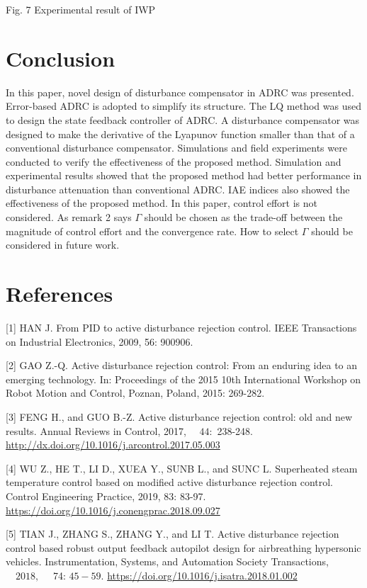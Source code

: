 \documentclass[10pt]{article}
\begin{document}
Fig. 7 Experimental result of IWP

\section{Conclusion}
In this paper, novel design of disturbance compensator in ADRC was presented. Error-based ADRC is adopted to simplify its structure. The LQ method was used to design the state feedback controller of ADRC. A disturbance compensator was designed to make the derivative of the Lyapunov function smaller than that of a conventional disturbance compensator. Simulations and field experiments were conducted to verify the effectiveness of the proposed method. Simulation and experimental results showed that the proposed method had better performance in disturbance attenuation than conventional ADRC. IAE indices also showed the effectiveness of the proposed method. In this paper, control effort is not considered. As remark 2 says $\Gamma$ should be chosen as the trade-off between the magnitude of control effort and the convergence rate. How to select $\Gamma$ should be considered in future work.

\section{References}
[1] HAN J. From PID to active disturbance rejection control. IEEE Transactions on Industrial Electronics, 2009, 56: 900906.

[2] GAO Z.-Q. Active disturbance rejection control: From an enduring idea to an emerging technology. In: Proceedings of the 2015 10th International Workshop on Robot Motion and Control, Poznan, Poland, 2015: 269-282.

[3] FENG H., and GUO B.-Z. Active disturbance rejection control: old and new results. Annual Reviews in Control, 2017, $\quad 44:$ 238-248. \href{http://dx.doi.org/10.1016/j.arcontrol.2017.05.003}{http://dx.doi.org/10.1016/j.arcontrol.2017.05.003}

[4] WU Z., HE T., LI D., XUEA Y., SUNB L., and SUNC L. Superheated steam temperature control based on modified active disturbance rejection control. Control Engineering Practice, 2019, 83: 83-97. \href{https://doi.org/10.1016/j.conengprac.2018.09.027}{https://doi.org/10.1016/j.conengprac.2018.09.027}

[5] TIAN J., ZHANG S., ZHANG Y., and LI T. Active disturbance rejection control based robust output feedback autopilot design for airbreathing hypersonic vehicles. Instrumentation, Systems, and Automation Society Transactions, $\quad 2018, \quad$ 74: $45-59$. \href{https://doi.org/10.1016/j.isatra.2018.01.002}{https://doi.org/10.1016/j.isatra.2018.01.002}
\end{document}
